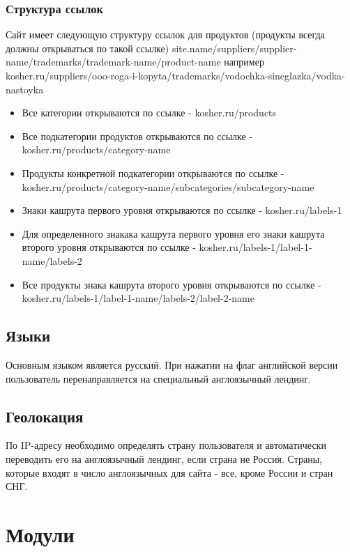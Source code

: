 \documentclass[DIV=calc, paper=a4, fontsize=11pt]{scrartcl} %
\begin{document}
\subsubsection{Структура ссылок}
Сайт имеет следующую структуру ссылок для продуктов (продукты всегда должны открываться по такой ссылке)
site.name/suppliers/supplier-name/trademarks/trademark-name/product-name
например
kosher.ru/suppliers/ooo-roga-i-kopyta/trademarks/vodochka-sineglazka/vodka-nastoyka

\begin{itemize}
	\item Все категории открываются по ссылке - kosher.ru/products
	\item Все подкатегории продуктов открываются по ссылке - kosher.ru/products/category-name
	\item Продукты конкретной подкатегории открываются по ссылке - kosher.ru/products/category-name/subcategories/subcategory-name
	\item Знаки кашрута первого уровня открываются по ссылке - kosher.ru/labels-1
	\item Для определенного знакака кашрута первого уровня его знаки кашрута второго уровня открываются по ссылке - kosher.ru/labels-1/label-1-name/labels-2
	\item Все продукты знака кашрута второго уровня открываются по ссылке - kosher.ru/labels-1/label-1-name/labels-2/label-2-name
\end{itemize}

\subsection{Языки}
Основным языком является русский. При нажатии на флаг английской версии пользователь перенаправляется на специальный англоязычный лендинг.

\subsection{Геолокация}
По IP-адресу необходимо определять страну пользователя и автоматически переводить его на англоязычный лендинг, если страна не Россия. Страны, которые входят в число англоязычных для сайта - все, кроме России и стран СНГ. 

\section{Модули}
\end{document}
